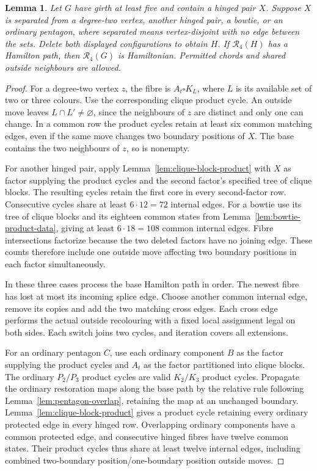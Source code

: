 \documentclass[11pt]{article}
\newtheorem{lemma}[theorem]{Lemma}
\theoremstyle{remark}
\newcommand{\R}{\mathcal R}
\numberwithin{equation}{section}
\numberwithin{table}{section}
\begin{document}
\begin{lemma}\label{lem:hinged-restorations}
Let $G$ have girth at least five and contain a hinged pair $X$.
Suppose $X$ is separated from a degree-two vertex, another hinged
pair, a bowtie, or an ordinary pentagon, where separated means
vertex-disjoint with no edge between the sets. Delete both displayed
configurations to obtain $H$. If $\R_4(H)$ has a Hamilton path,
then $\R_4(G)$ is Hamiltonian. Permitted chords and shared outside
neighbours are allowed.
\end{lemma}
\begin{proof}
For a degree-two vertex $z$, the fibre is $A_t\square K_L$, where
$L$ is its available set of two or three colours. Use the
corresponding clique product cycle. An outside move leaves $L\cap L'\ne
\varnothing$, since the neighbours of $z$ are distinct and only one
can change. In a common row the product cycles retain at least six common
matching edges, even if the same move changes two boundary positions of $X$.
The base contains the two neighbours of $z$, so is nonempty.

For another hinged pair, apply Lemma~\ref{lem:clique-block-product}
with $X$ as factor supplying the product cycles and the second factor's specified tree of clique blocks.
The resulting cycles retain the first core in every second-factor row.
Consecutive cycles share at least $6\cdot12=72$ internal edges.
For a bowtie use its tree of clique blocks and its eighteen common states from
Lemma~\ref{lem:bowtie-product-data}, giving at least $6\cdot18=108$
common internal edges. Fibre intersections factorize because the two
deleted factors have no joining edge. These counts therefore include
one outside move affecting two boundary positions in each factor simultaneously.

In these three cases process the base Hamilton path in order.
The newest fibre has lost at most its incoming splice edge. Choose
another common internal edge, remove its copies and add the two
matching cross edges. Each cross edge performs the actual outside
recolouring with a fixed local assignment legal on both sides. Each
switch joins two cycles, and iteration covers all extensions.

For an ordinary pentagon $C$, use each ordinary component $B$ as the
factor supplying the product cycles and $A_t$ as the factor partitioned into clique blocks. The ordinary
$P_2/P_3$ product cycles are valid $K_2/K_3$ product cycles. Propagate the ordinary
restoration maps along the base path by the relative rule following
Lemma~\ref{lem:pentagon-overlap}, retaining the map at an unchanged
boundary. Lemma~\ref{lem:clique-block-product} gives a product cycle
retaining every ordinary protected edge in every hinged row.
Overlapping ordinary components have a common protected edge, and
consecutive hinged fibres have twelve common states. Their product
cycles thus share at least twelve internal edges, including combined
two-boundary position/one-boundary position outside moves.


\end{proof}
\end{document}

